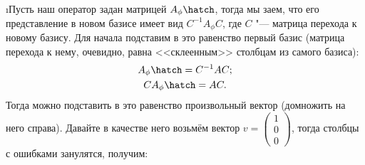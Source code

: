 \i Пусть наш оператор задан матрицей $A_{\phi}\hatch$, тогда мы заем, что его представление в новом базисе имеет вид $C^{-1}A_{\phi}C$, где $C$ "--- матрица перехода к новому базису. Для начала подставим в это равенство первый базис (матрица перехода к нему, очевидно, равна <<склеенным>> столбцам из самого базиса):
\begin{gather*}
    A_{\phi}\hatch = C^{-1}AC;\\
    CA_{\phi}\hatch = AC.
\end{gather*}
Тогда можно подставить в это равенство произвольный вектор (домножить на него справа). Давайте в качестве него возьмём вектор $v = \begin{pmatrix} 1\\ 0\\ 0 \end{pmatrix}$, тогда столбцы с ошибками занулятся, получим:
